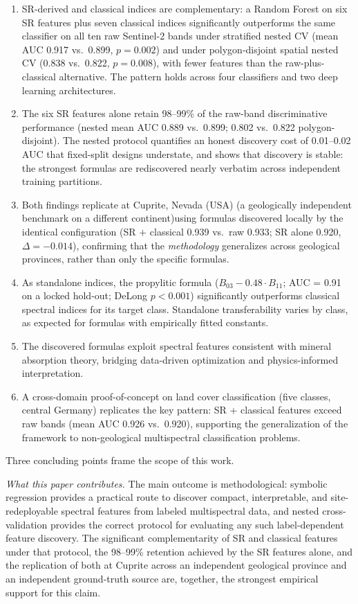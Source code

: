 \documentclass[preprint,authoryear,number]{elsarticle}
\begin{document}
\begin{enumerate}
  \item SR-derived and classical indices are complementary: a Random Forest on six SR features plus seven classical indices significantly outperforms the same classifier on all ten raw Sentinel-2 bands under stratified nested CV (mean AUC 0.917 vs.\ 0.899, $p = 0.002$) and under polygon-disjoint spatial nested CV (0.838 vs.\ 0.822, $p = 0.008$), with fewer features than the raw-plus-classical alternative. The pattern holds across four classifiers and two deep learning architectures.
  \item The six SR features alone retain 98--99\% of the raw-band discriminative performance (nested mean AUC 0.889 vs.\ 0.899; 0.802 vs.\ 0.822 polygon-disjoint). The nested protocol quantifies an honest discovery cost of 0.01--0.02 AUC that fixed-split designs understate, and shows that discovery is stable: the strongest formulas are rediscovered nearly verbatim across independent training partitions.
  \item Both findings replicate at Cuprite, Nevada (USA) (a geologically independent benchmark on a different continent)using formulas discovered locally by the identical configuration (SR $+$ classical 0.939 vs.\ raw 0.933; SR alone 0.920, $\Delta = -0.014$), confirming that the \emph{methodology} generalizes across geological provinces, rather than only the specific formulas.
  \item As standalone indices, the propylitic formula ($B_{03} - 0.48 \cdot B_{11}$; AUC = 0.91 on a locked hold-out; DeLong $p < 0.001$) significantly outperforms classical spectral indices for its target class. Standalone transferability varies by class, as expected for formulas with empirically fitted constants.
  \item The discovered formulas exploit spectral features consistent with mineral absorption theory, bridging data-driven optimization and physics-informed interpretation.
  \item A cross-domain proof-of-concept on land cover classification (five classes, central Germany) replicates the key pattern: SR + classical features exceed raw bands (mean AUC 0.926 vs.\ 0.920), supporting the generalization of the framework to non-geological multispectral classification problems.
\end{enumerate}

Three concluding points frame the scope of this work.

\emph{What this paper contributes.} The main outcome is methodological: symbolic regression provides a practical route to discover compact, interpretable, and site-redeployable spectral features from labeled multispectral data, and nested cross-validation provides the correct protocol for evaluating any such label-dependent feature discovery. The significant complementarity of SR and classical features under that protocol, the 98--99\% retention achieved by the SR features alone, and the replication of both at Cuprite across an independent geological province and an independent ground-truth source are, together, the strongest empirical support for this claim.
\end{document}

